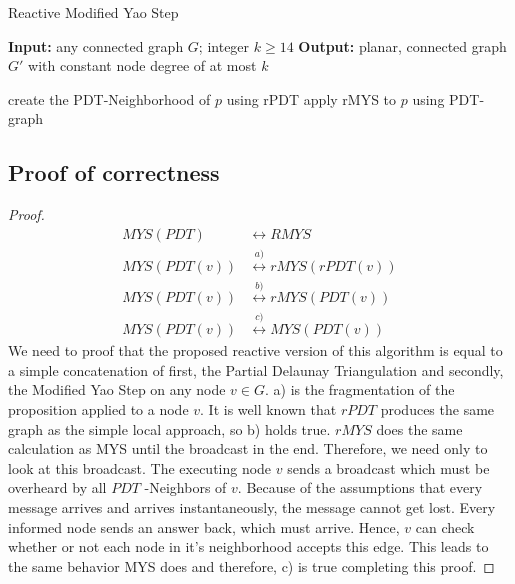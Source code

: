 \begin{algorithm}\small
\caption{Reactive Modified Yao Step}\label{RMYS}
\begin{algorithmic}[0]
\Statex \textbf{Input:} any connected graph $G $; integer $k\geq 14 $
\Statex \textbf{Output:} planar, connected graph $G' $ with constant node degree of at most $k $

\Statex

	\State create the PDT-Neighborhood of $p $ using rPDT
	\State apply rMYS to $p $ using PDT-graph
\EndFor 
\end{algorithmic}
\end{algorithm}



\subsection{Proof of correctness}
\begin{proof}
\begin{equation*}
\begin{split}
	MYS(PDT) &\leftrightarrow RMYS\\
	MYS(PDT(v)) &\stackrel{a)}{\leftrightarrow} rMYS(rPDT(v)) \\
    MYS(PDT(v)) &\stackrel{b)}{\leftrightarrow} rMYS(PDT(v))\\
    MYS(PDT(v)) &\stackrel{c)}{\leftrightarrow} MYS(PDT(v)) 
\end{split}
\end{equation*}
We need to proof that the proposed reactive version of this algorithm is equal to a simple concatenation of first, the Partial Delaunay Triangulation and secondly, the Modified Yao Step on any node $v \in G$.
a) is the fragmentation of the proposition applied to a node $v $.
It is well known that $rPDT $ produces the same graph as the simple local approach, so b) holds true.
$rMYS $ does the same calculation as MYS until the broadcast in the end.
Therefore, we need only to look at this broadcast.
The executing node $v $ sends a broadcast which must be overheard by all $PDT $ -Neighbors of $v $.
Because of the assumptions that every message arrives and arrives instantaneously, the message cannot get lost.
Every informed node sends an answer back, which must arrive.
Hence, $v $ can check whether or not each node in it's neighborhood accepts this edge.
This leads to the same behavior MYS does and therefore, c) is true completing this proof.
\end{proof}

